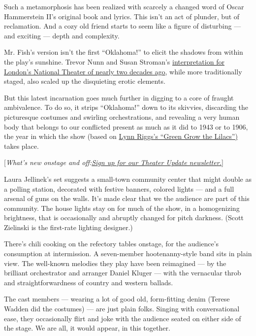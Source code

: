 Such a metamorphosis has been realized with scarcely a changed word of
Oscar Hammerstein II's original book and lyrics. This isn't an act of
plunder, but of reclamation. And a cozy old friend starts to seem like a
figure of disturbing --- and exciting --- depth and complexity.

Mr. Fish's version isn't the first ``Oklahoma!'' to elicit the shadows
from within the play's sunshine. Trevor Nunn and Susan Stroman's
\href{https://www.nytimes3xbfgragh.onion/2002/03/22/movies/theater-review-this-time-a-beautiful-mornin-with-a-dark-side.html}{interpretation
for London's National Theater of nearly two decades ago}, while more
traditionally staged, also scaled up the disquieting erotic elements.

But this latest incarnation goes much further in digging to a core of
fraught ambivalence. To do so, it strips ``Oklahoma!'' down to its
skivvies, discarding the picturesque costumes and swirling
orchestrations, and revealing a very human body that belongs to our
conflicted present as much as it did to 1943 or to 1906, the year in
which the show (based on
\href{http://thislandpress.com/2014/04/30/broadways-forgotten-man/}{Lynn
Riggs's ``Green Grow the Lilacs'')} takes place.

{[}\emph{What's new onstage and
off:\href{https://www.nytimes3xbfgragh.onion/newsletters/theater-update?module=inline}{Sign
up for our Theater Update newsletter.}}{]}

Laura Jellinek's set suggests a small-town community center that might
double as a polling station, decorated with festive banners, colored
lights --- and a full arsenal of guns on the walls. It's made clear that
we the audience are part of this community. The house lights stay on for
much of the show, in a homogenizing brightness, that is occasionally and
abruptly changed for pitch darkness. (Scott Zielinski is the first-rate
lighting designer.)

There's chili cooking on the refectory tables onstage, for the
audience's consumption at intermission. A seven-member hootenanny-style
band sits in plain view. The well-known melodies they play have been
reimagined --- by the brilliant orchestrator and arranger Daniel Kluger
--- with the vernacular throb and straightforwardness of country and
western ballads.

The cast members --- wearing a lot of good old, form-fitting denim
(Terese Wadden did the costumes) --- are just plain folks. Singing with
conversational ease, they occasionally flirt and joke with the audience
seated on either side of the stage. We are all, it would appear, in this
together.

